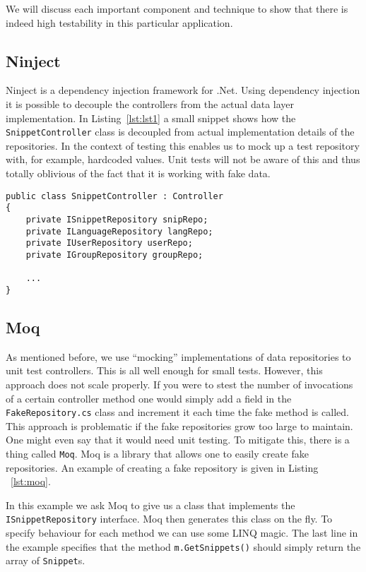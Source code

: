 \documentclass[10pt,a4paper,BCOR12mm, headexclude, footexclude,
  twoside, openright]{scrartcl}
\numberwithin{equation}{section} %
\numberwithin{figure}{section} %
\numberwithin{table}{section} %
\begin{document}
We will discuss each important component and technique to show that there is
indeed high testability in this particular application.

\subsection{Ninject}
Ninject is a dependency injection framework for .Net. Using dependency injection
it is possible to decouple the controllers from the actual data layer
implementation. In Listing~\ref{lst:lst1} a small snippet shows how the
\texttt{SnippetController} class is decoupled from actual implementation details
of the repositories. In the context of testing this enables us to mock up a test
repository with, for example, hardcoded values. Unit tests will not be aware of
this and thus totally oblivious of the fact that it is working with fake data.


\begin{lstlisting}[caption={Example of decoupling controller from data layer}, label={lst:lst1}]
public class SnippetController : Controller
{
    private ISnippetRepository snipRepo;
    private ILanguageRepository langRepo;
    private IUserRepository userRepo;
    private IGroupRepository groupRepo;

    ...
}
\end{lstlisting}
\subsection{Moq}
As mentioned before, we use ``mocking'' implementations of data repositories to
unit test controllers. This is all well enough for small tests. However, this
approach does not scale properly. If you were to stest the number of invocations
of a certain controller method one would simply add a field in the
\texttt{FakeRepository.cs} class and increment it each time the fake method is
called. This approach is problematic if the fake repositories grow too large to
maintain. One might even say that it would need unit testing. To mitigate this,
there is a thing called \texttt{Moq}. Moq is a library that allows one to easily
create fake repositories. An example of creating a fake repository is given in
Listing ~\ref{lst:moq}.

In this example we ask Moq to give us a class that implements the
\texttt{ISnippetRepository} interface. Moq then generates this class on the
fly. To specify behaviour for each method we can use some LINQ magic. The last
line in the example specifies that the method \texttt{m.GetSnippets()} should
simply return the array of \texttt{Snippet}s.
\end{document}
